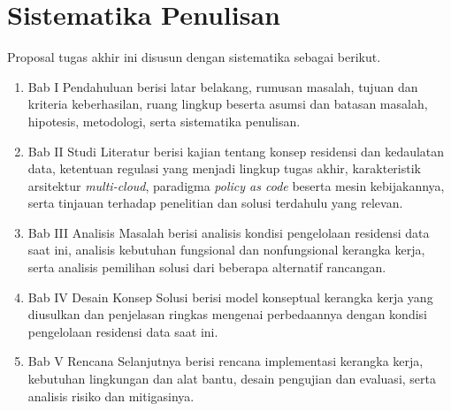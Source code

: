 \section{Sistematika Penulisan}

Proposal tugas akhir ini disusun dengan sistematika sebagai berikut.

\begin{enumerate}

\item Bab I Pendahuluan berisi latar belakang, rumusan masalah, tujuan dan kriteria keberhasilan, ruang lingkup beserta asumsi dan batasan masalah, hipotesis, metodologi, serta sistematika penulisan.

\item Bab II Studi Literatur berisi kajian tentang konsep residensi dan kedaulatan data, ketentuan regulasi yang menjadi lingkup tugas akhir, karakteristik arsitektur \textit{multi-cloud}, paradigma \textit{policy as code} beserta mesin kebijakannya, serta tinjauan terhadap penelitian dan solusi terdahulu yang relevan.

\item Bab III Analisis Masalah berisi analisis kondisi pengelolaan residensi data saat ini, analisis kebutuhan fungsional dan nonfungsional kerangka kerja, serta analisis pemilihan solusi dari beberapa alternatif rancangan.

\item Bab IV Desain Konsep Solusi berisi model konseptual kerangka kerja yang diusulkan dan penjelasan ringkas mengenai perbedaannya dengan kondisi pengelolaan residensi data saat ini.

\item Bab V Rencana Selanjutnya berisi rencana implementasi kerangka kerja, kebutuhan lingkungan dan alat bantu, desain pengujian dan evaluasi, serta analisis risiko dan mitigasinya.

\end{enumerate}
